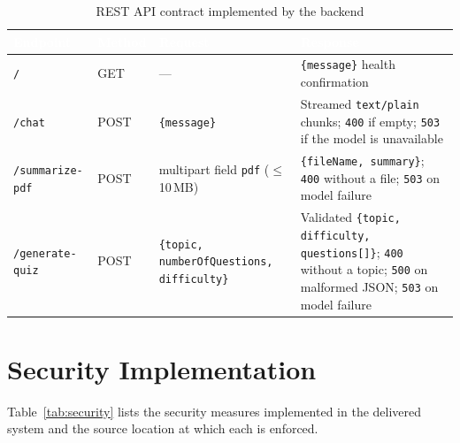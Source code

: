 \documentclass[12pt,a4paper,oneside]{report}
\begin{document}
\begin{table}[H]
\centering
\caption{REST API contract implemented by the backend}
\label{tab:api}
\small
\begin{tabularx}{\textwidth}{@{}p{2.9cm}p{1.3cm}p{4.0cm}X@{}}
\toprule
\rowcolor{tblhead} \textcolor{white}{\textbf{Endpoint}} &
\textcolor{white}{\textbf{Method}} &
\textcolor{white}{\textbf{Request}} &
\textcolor{white}{\textbf{Response}} \\
\midrule
\texttt{/}                 & GET  & --- & \texttt{\{message\}} health confirmation \\
\texttt{/chat}             & POST & \texttt{\{message\}} & Streamed \texttt{text/plain} chunks; \texttt{400} if empty; \texttt{503} if the model is unavailable \\
\texttt{/summarize-pdf}    & POST & multipart field \texttt{pdf} ($\leq$10\,MB) & \texttt{\{fileName, summary\}}; \texttt{400} without a file; \texttt{503} on model failure \\
\texttt{/generate-quiz}    & POST & \texttt{\{topic, numberOfQuestions, difficulty\}} & Validated \texttt{\{topic, difficulty, questions[]\}}; \texttt{400} without a topic; \texttt{500} on malformed JSON; \texttt{503} on model failure \\
\bottomrule
\end{tabularx}
\end{table}

\section{Security Implementation}

Table~\ref{tab:security} lists the security measures implemented in the delivered system and the source location at which each is enforced.
\end{document}
